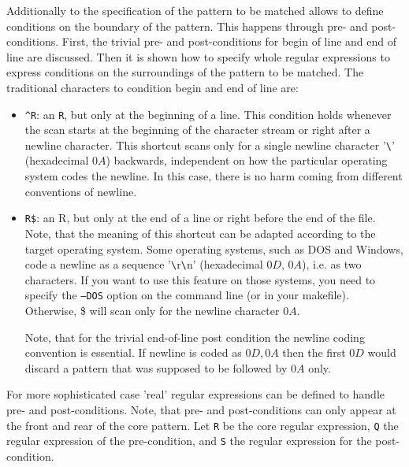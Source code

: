 Additionally to the specification of the pattern to be matched 
{\quex} allows to define conditions on the boundary of the pattern.
This happens through pre- and post-conditions. First, the trivial
pre- and post-conditions for begin of line and end of line are discussed.
Then it is shown how to specify whole regular expressions to express
conditions on the surroundings of the pattern to be matched. The traditional
characters to condition begin and end of line are:


\begin{itemize}

\item {\tt \verb|^|R}: an {\tt R}, but only at the beginning of a line. This condition
        holds whenever the scan starts at the beginning of the character stream or
	right after a newline character. This shortcut scans only for a single 
	newline character '\verb|\|' (hexadecimal $0A$) backwards, independent
	on how the particular operating system codes the newline. In this case, 
	there is no harm coming from different conventions of newline.

\item {\tt R\$}: an R, but only at the end of a line or right before the end of the
     file. Note, that the meaning of this shortcut can be adapted according to the 
     target operating system. Some operating systems, such as DOS and Windows, code
     a newline as a sequence '\verb|\|r\verb|\|n' (hexadecimal $0D,\,0A$), i.e.
     as two characters. If you want to use this feature on those systems, you need 
     to specify the {\tt --DOS} option on the command line (or in your makefile).
     Otherwise, \$ will scan only for the newline character $0A$. 

     Note, that for the trivial end-of-line post condition the newline coding
     convention is essential.  If newline is coded as $0D$,\,$0A$ then the
     first $0D$ would discard a pattern that was supposed to be followed by
     $0A$ only.

\end{itemize}

For more sophisticated case 'real' regular expressions can be defined to handle
pre- and post-conditions. Note, that pre- and post-conditions can only appear
at the front and rear of the core pattern. Let {\tt R} be the core regular expression,
{\tt Q} the regular expression of the pre-condition, and {\tt S} the regular expression
for the post-condition.


